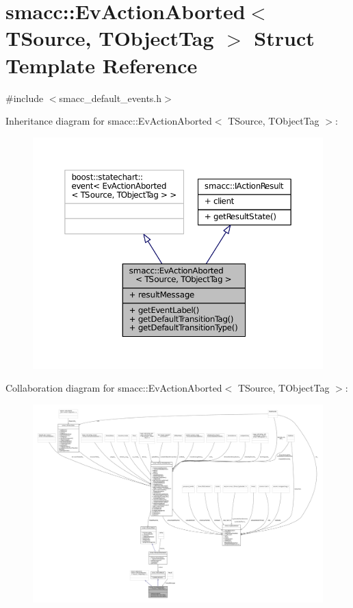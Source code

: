 \hypertarget{structsmacc_1_1EvActionAborted}{}\section{smacc\+:\+:Ev\+Action\+Aborted$<$ T\+Source, T\+Object\+Tag $>$ Struct Template Reference}
\label{structsmacc_1_1EvActionAborted}


{\ttfamily \#include $<$smacc\+\_\+default\+\_\+events.\+h$>$}



Inheritance diagram for smacc\+:\+:Ev\+Action\+Aborted$<$ T\+Source, T\+Object\+Tag $>$\+:
\nopagebreak
\begin{figure}[H]
\begin{center}
\leavevmode
\includegraphics[width=350pt]{structsmacc_1_1EvActionAborted__inherit__graph}
\end{center}
\end{figure}


Collaboration diagram for smacc\+:\+:Ev\+Action\+Aborted$<$ T\+Source, T\+Object\+Tag $>$\+:
\nopagebreak
\begin{figure}[H]
\begin{center}
\leavevmode
\includegraphics[width=350pt]{structsmacc_1_1EvActionAborted__coll__graph}
\end{center}
\end{figure}
